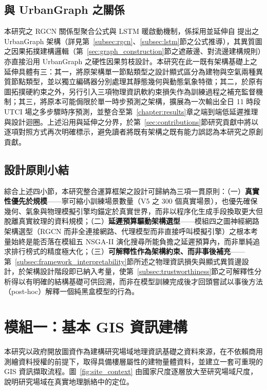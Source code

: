 \subsection{與 UrbanGraph 之關係}
\label{subsec:framework_urbangraph_relation}

本研究之 RGCN 關係型聚合公式與 LSTM 暖啟動機制，係採用並延伸自 \citet{xin2025urbangraph} 提出之 UrbanGraph 架構（詳見第~\ref{subsec:rgcn}、\ref{subsec:lstm}節之公式推導），其異質圖之因果拓撲建構邏輯（第~\ref{sec:graph_construction}節之遮蔽邊、對流邊建構規則）亦直接沿用 UrbanGraph 之硬性因果剪枝設計。本研究在此一既有架構基礎上之延伸具體有三：其一，將原架構單一節點類型之設計顯式區分為建物與空氣兩種異質節點類型，並以獨立編碼器分別處理其靜態幾何與動態氣象特徵；其二，於原有圖拓撲硬約束之外，另行引入三項物理資訊軟約束損失作為訓練過程之補充監督機制；其三，將原本可能侷限於單一時步預測之架構，擴展為一次輸出全日 11 時段 UTCI 場之多步驟時序預測，並整合至第~\ref{chapter:results}章之端到端低延遲推理與設計迴圈。上述沿用與延伸之分界，於第~\ref{sec:contributions}節研究貢獻中將以逐項對照方式再次明確標示，避免讀者將既有架構之既有能力誤認為本研究之原創貢獻。

\subsection{設計原則小結}
\label{subsec:framework_principles}

綜合上述四小節，本研究整合運算框架之設計可歸納為三項一貫原則：（一）\textbf{真實性優先於規模}——寧可縮小訓練場景數量（V5 之 300 個真實場景），也優先確保幾何、氣象與物理模擬引擎均錨定於真實世界，而非以程序化生成手段換取更大但脫離真實紋理的資料規模；（二）\textbf{延遲預算驅動架構選型}——模組四之圖神經網路架構選型（RGCN 而非全連接網路、代理模型而非直接呼叫模擬引擎）之根本考量始終是能否落在模組五 NSGA-II 演化搜尋所能負擔之延遲預算內，而非單純追求排行榜式的精度極大化；（三）\textbf{可解釋性作為架構約束、而非事後補充}——第~\ref{subsec:framework_interpretability}節所述之物理資訊損失與顯式異質邊設計，於架構設計階段即已納入考量，使第~\ref{subsec:trustworthiness}節之可解釋性分析得以有明確的結構基礎可供回溯，而非在模型訓練完成後才回頭嘗試以事後方法（post-hoc）解釋一個純黑盒模型的行為。


\section{模組一：基本 GIS 資訊建構}
\label{sec:gis_foundation}

本研究以政府開放圖資作為建構研究場域地理資訊基礎之資料來源，在不依賴商用測繪資料授權的前提下，取得具備樓層屬性的建物量體資料，並建立一套可重現的 GIS 資訊擷取流程。圖~\ref{fig:site_context} 由國家尺度逐層放大至研究場域尺度，說明研究場域在真實地理脈絡中的定位。

